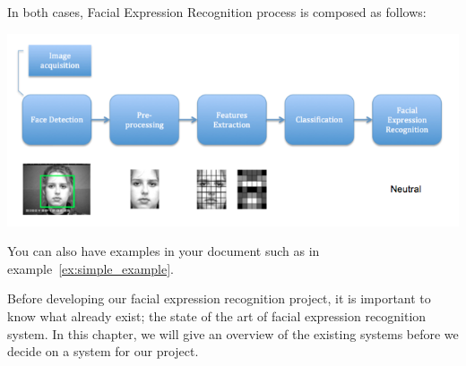 In both cases, Facial Expression Recognition process is composed as follows:


\noindent \includegraphics[scale=0.6]{figures/facial_expression_recognition_process}


You can also have examples in your document such as in example~\ref{ex:simple_example}.

Before developing our facial expression recognition project, it is important to know what already exist; the state of the art of facial expression recognition system. In this chapter, we will give an overview of the existing systems before we decide on a system for our project.
